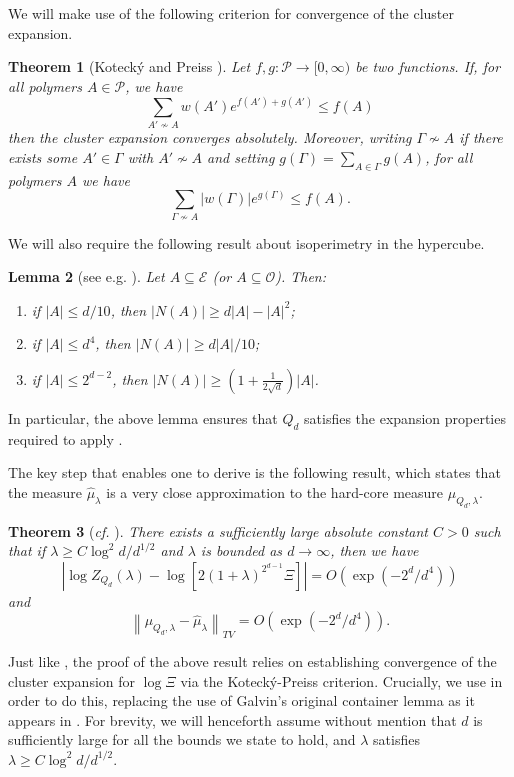 \documentclass[a4paper]{amsart}
\newtheorem{thm}{Theorem}[section]
\newtheorem{lem}[thm]{Lemma}
\theoremstyle{definition}
\newcommand{\cO}{\mathcal{O} }
\newcommand{\cE}{\mathcal{E} }
\newcommand{\cP}{\mathcal{P} }
\newcommand{\beq}[1]{\begin{equation}\label{#1}}
\newcommand{\enq}[0]{\end{equation}}
\newcommand{\nin}[0]{\noindent}
\newcommand{\0}[0]{\emptyset}
\newcommand{\lam}{\lambda}
\begin{document}
\nin We will make use of the following criterion for convergence of the cluster expansion.
\begin{thm}[Koteck\'y and Preiss {\cite{kp}}]
    Let $f, g:\cP\rightarrow[0, \infty)$ be two functions. If, for all polymers $A\in\cP$, we have
    \beq{kpcond} \sum_{A'\not\sim A} w(A')e^{f(A')+g(A')} \leq f(A)\enq
    then the cluster expansion converges absolutely. Moreover, writing $\Gamma\not\sim A$ if there exists some $A'\in\Gamma$ with $A'\not\sim A$ and setting $g(\Gamma)=\sum_{A\in\Gamma} g(A)$, for all polymers $A$ we have
    \beq{kpbd} \sum_{\Gamma\not\sim A} |w(\Gamma)|e^{g(\Gamma)}\leq f(A). \enq
\end{thm}

We will also require the following result about isoperimetry in the hypercube.

\begin{lem}[see e.g. \cite{galvin.hom,sapokorcube}]

    Let $A\subseteq \cE$ (or $A\subseteq \cO$). Then:
    \begin{enumerate}
        \item if $|A|\leq d/10$, then $|N(A)|\geq d|A|-|A|^2$;
        \item if $|A|\leq d^4$, then $|N(A)|\geq d|A|/10$;
        \item if $|A|\leq 2^{d-2}$, then $|N(A)|\geq \left( 1+\frac{1}{2\sqrt{d}}\right)|A|$.
    \end{enumerate}
\end{lem}

\nin In particular, the above lemma ensures that $Q_d$ satisfies the expansion properties required to apply .

The key step that enables one to derive  is the following result, which states that the measure $\hat{\mu}_\lam$ is a very close approximation to the hard-core measure $\mu_{Q_d,\lam}$.

\begin{thm}[\textit{cf.} {\cite[Lemma 14]{hypercube}}]\label{clusterapprox}
    There exists a sufficiently large absolute constant $C>0$ such that if $\lam\geq C\log^2 d/d^{1/2}$ and $\lam$ is bounded as $d\rightarrow\infty$, then we have
    \[ \left| \log Z_{Q_d}(\lam) -\log \left[ 2(1+\lam)^{2^{d-1}}\Xi\right]\right| = O\left(\exp(-2^d/d^4)\right)\]
  and
    \beq{tvbd} \left\|\mu_{Q_d,\lam}-\hat{\mu}_\lam \right\|_{TV}=O\left(\exp(-2^d/d^4)\right). \enq
\end{thm}

Just like \cite[Lemma 14]{hypercube}, the proof of the above result relies on establishing convergence of the cluster expansion for $\log \Xi$ via the Koteck\'y-Preiss criterion. Crucially, we use  in order to do this, replacing the use of Galvin's original container lemma as it appears in \cite{hypercube}. For brevity, we will henceforth assume without mention that $d$ is sufficiently large for all the bounds we state to hold, and $\lam$ satisfies $\lam\geq C\log^2 d/d^{1/2}$.
\end{document}
